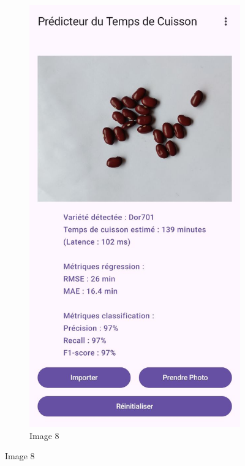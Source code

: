 \begin{figure}[H]
    \begin{subfigure}{0.24\textwidth}
        \centering
        \includegraphics[width=\linewidth]{figures/test8.jpg}
        \caption{Image 8}
    \end{subfigure}\hfill

\end{figure}
